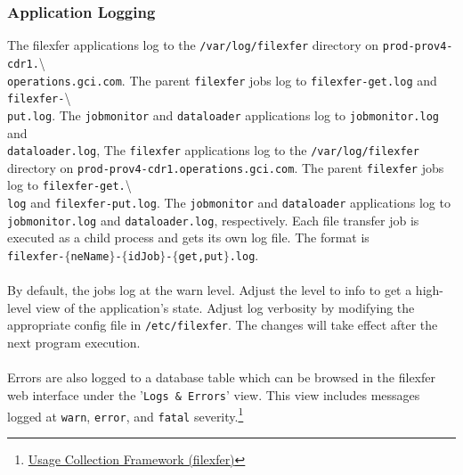\documentclass[12pt,letterpaper,dvips]{article}
\begin{document}
\subsubsection{Application Logging}
The filexfer applications log to the \texttt{/var/log/filexfer}
directory on \texttt{prod-prov4-cdr1.}\textbackslash\\
\texttt{operations.gci.com}. The parent \texttt{filexfer} jobs
log to \texttt{filexfer-get.log} and
\texttt{filexfer-}\textbackslash\\
\texttt{put.log}.
The \texttt{jobmonitor} and \texttt{dataloader} applications
log to \texttt{jobmonitor.log} and\\
\texttt{dataloader.log}, The \texttt{filexfer} applications
log to the \texttt{/var/log/filexfer} directory on
\texttt{prod-prov4-cdr1.operations.gci.com}. The parent
\texttt{filexfer} jobs
log to \texttt{filexfer-get.}\textbackslash\\
\texttt{log} and \texttt{filexfer-put.log}. The
\texttt{jobmonitor} and \texttt{dataloader} applications log to\\
\texttt{jobmonitor.log} and \texttt{dataloader.log}, respectively. Each file
transfer job is executed as a child process and gets its own log file. The
format is\\
\texttt{filexfer-}$\{$\texttt{neName}$\}$\texttt{-}$\{$\texttt{idJob}$\}$\texttt{-}$\{$\texttt{get,put}$\}$\texttt{.log}.\\
\\
By default, the jobs log at the warn level.  Adjust the level to info to get a
high-level view of the application's state.  Adjust log verbosity by modifying
the appropriate config file in \texttt{/etc/filexfer}.  The changes will take
effect after the next program execution.\\
\\
Errors are also logged to a database table which can be browsed in the
filexfer web interface under the '\texttt{Logs \& Errors}' view.  This view
includes messages logged at \texttt{warn}, \texttt{error}, and \texttt{fatal}
severity.\footnote{\href{http://oss-wiki.operations.gci.com/dev/index.php/Usage_Collection\_Framework\_(filexfer)}{Usage Collection Framework (filexfer)}}


\end{document}
